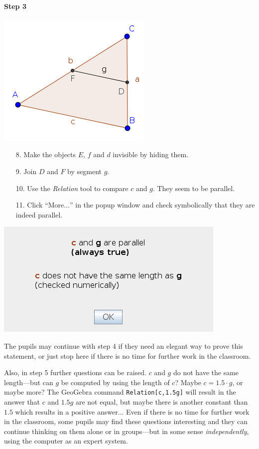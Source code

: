 \documentclass{article}
\begin{document}
\paragraph{Step 3}
\begin{center}
\includegraphics[scale=0.5]{classroom3}
\end{center}
\begin{enumerate}
    \item[8.] Make the objects $E$, $f$ and $d$ invisible by hiding them.
    \item[9.] Join $D$ and $F$ by segment $g$.
    \item[10.] Use the \textit{Relation} tool to compare $c$ and $g$. They seem to be parallel.
    \item[11.] Click ``More$\ldots$'' in the popup window and check symbolically that they are indeed parallel.
\end{enumerate}
\begin{center}
\includegraphics[scale=0.5]{classroom3-Relation}
\end{center}
The pupils may continue with step 4 if they need an elegant way to prove this statement, or just stop here if there is no time for further work in the classroom.

Also, in step 5 further questions can be raised. $c$ and $g$ do not have the same length---but can $g$ be computed by using the length of $c$? Maybe $c=1.5\cdot g$, or maybe more? The GeoGebra command \texttt{Relation[c,1.5g]} will result in the answer that $c$ and $1.5g$ are not equal, but maybe there is another constant than $1.5$ which results in a positive answer$\ldots$ Even if there is no time for further work in the classroom, some pupils may find these questions interesting and they can continue thinking on them alone or in groups---but in some sense \textit{independently}, using the computer as an expert system.
\end{document}
